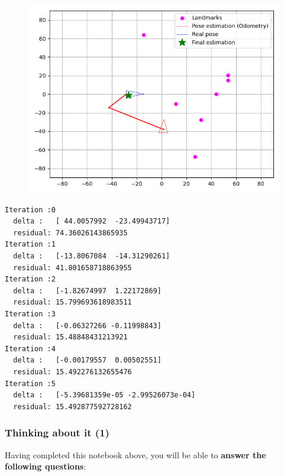 \documentclass[11pt]{article}
\begin{document}
\begin{figure}
\centering
\includegraphics{images/lastOutput_1.png}
\end{figure}

    \begin{Verbatim}[commandchars=\\\{\}]
Iteration :0
  delta :   [ 44.0057992  -23.49943717]
  residual: 74.36026143865935
Iteration :1
  delta :   [-13.8067084  -14.31290261]
  residual: 41.801658718863955
Iteration :2
  delta :   [-1.82674997  1.22172869]
  residual: 15.799693618983511
Iteration :3
  delta :   [-0.06327266 -0.11998843]
  residual: 15.48848431213921
Iteration :4
  delta :   [-0.00179557  0.00502551]
  residual: 15.492276132655476
Iteration :5
  delta :   [-5.39681359e-05 -2.99526073e-04]
  residual: 15.492877592728162
    \end{Verbatim}

    \hypertarget{thinking-about-it-1}{%
\subsubsection{Thinking about it (1)}\label{thinking-about-it-1}}

Having completed this notebook above, you will be able to \textbf{answer
the following questions}:
\end{document}
